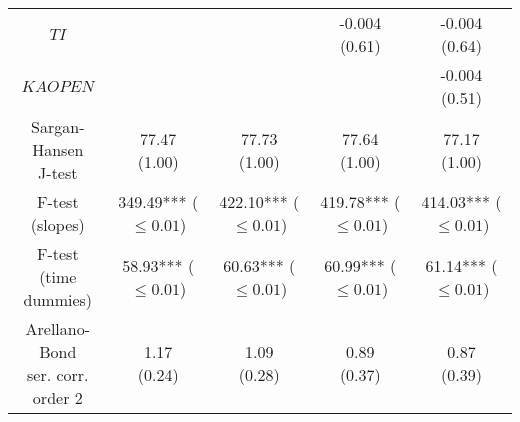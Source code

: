 \begin{tabular}{ccccc}
                                          $TI$ &                                      &                                      &            \makecell{-0.004\\(0.61)} &            \makecell{-0.004\\(0.64)} \\
                                      $KAOPEN$ &                                      &                                      &                                      &            \makecell{-0.004\\(0.51)} \\
              \makecell{Sargan-Hansen\\J-test} &             \makecell{77.47\\(1.00)} &             \makecell{77.73\\(1.00)} &             \makecell{77.64\\(1.00)} &             \makecell{77.17\\(1.00)} \\
                   \makecell{F-test\\(slopes)} &  \makecell{349.49***\\($\leq 0.01$)} &  \makecell{422.10***\\($\leq 0.01$)} &  \makecell{419.78***\\($\leq 0.01$)} &  \makecell{414.03***\\($\leq 0.01$)} \\
             \makecell{F-test\\(time dummies)} &   \makecell{58.93***\\($\leq 0.01$)} &   \makecell{60.63***\\($\leq 0.01$)} &   \makecell{60.99***\\($\leq 0.01$)} &   \makecell{61.14***\\($\leq 0.01$)} \\
 \makecell{Arellano-Bond\\ser. corr.  order 2} &              \makecell{1.17\\(0.24)} &              \makecell{1.09\\(0.28)} &              \makecell{0.89\\(0.37)} &              \makecell{0.87\\(0.39)} \\
\bottomrule
\end{tabular}
